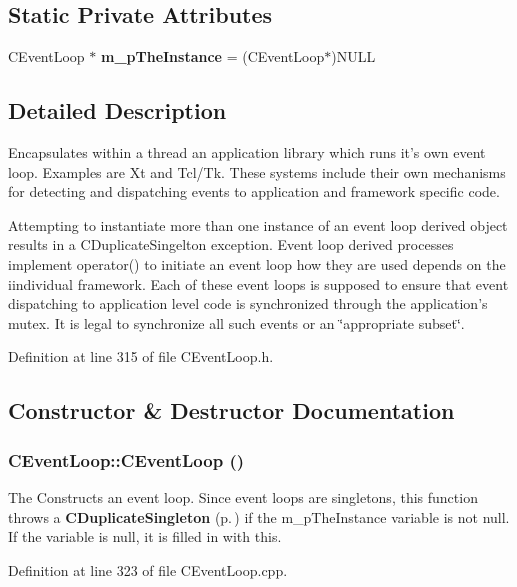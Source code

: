 \subsection*{Static Private Attributes}
\begin{CompactItemize}
\item 
CEvent\-Loop $\ast$ {\bf m\_\-p\-The\-Instance} = (CEvent\-Loop$\ast$)NULL
\end{CompactItemize}


\subsection{Detailed Description}
Encapsulates within a thread an application library which  runs it's own event loop. Examples are Xt and Tcl/Tk. These systems include their own mechanisms for detecting and dispatching events to application and framework specific code.

Attempting to instantiate more than one instance of an event  loop derived object results in a CDuplicate\-Singelton exception. Event loop derived processes implement operator() to  initiate an event loop how they are used depends on the iindividual framework. Each of these event loops is supposed to ensure that event dispatching to application level code is synchronized through the application's mutex. It is legal to synchronize all such events or an \char`\"{}appropriate subset\char`\"{}. 



Definition at line 315 of file CEvent\-Loop.h.

\subsection{Constructor \& Destructor Documentation}
\subsubsection{\setlength{\rightskip}{0pt plus 5cm}CEvent\-Loop::CEvent\-Loop ()}\label{classCEventLoop_a0}


The Constructs an event loop. Since event loops are singletons, this function throws a {\bf CDuplicate\-Singleton} {\rm (p.\,\pageref{classCDuplicateSingleton})} if the m\_\-p\-The\-Instance variable is not null. If the variable is null, it is filled in with this. 

Definition at line 323 of file CEvent\-Loop.cpp.

